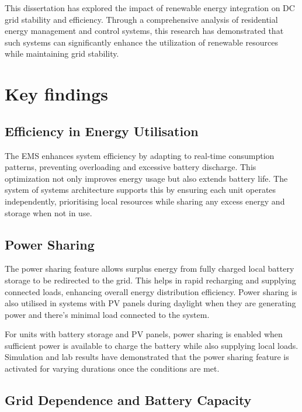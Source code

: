 This dissertation has explored the impact of renewable energy integration on DC grid stability and efficiency. Through a comprehensive analysis of residential energy management and control systems, this research has demonstrated that such systems can significantly enhance the utilization of renewable resources while maintaining grid stability.\par

\section{Key findings}
\subsection{Efficiency in Energy Utilisation}
The EMS enhances system efficiency by adapting to real-time consumption patterns, preventing overloading and excessive battery discharge. This optimization not only improves energy usage but also extends battery life. The system of systems architecture supports this by ensuring each unit operates independently, prioritising local resources while sharing any excess energy and storage when not in use.
\subsection{Power Sharing}
The power sharing feature allows surplus energy from fully charged local battery storage to be redirected to the grid. This helps in rapid recharging and supplying connected loads, enhancing overall energy distribution efficiency. Power sharing is also utilised in systems with PV panels during daylight when they are generating power and there's minimal load connected to the system.\par
For units with battery storage and PV panels, power sharing is enabled when sufficient power is available to charge the battery while also supplying local loads. Simulation and lab results have demonstrated that the power sharing feature is activated for varying durations once the conditions are met.
\subsection{Grid Dependence and Battery Capacity}

